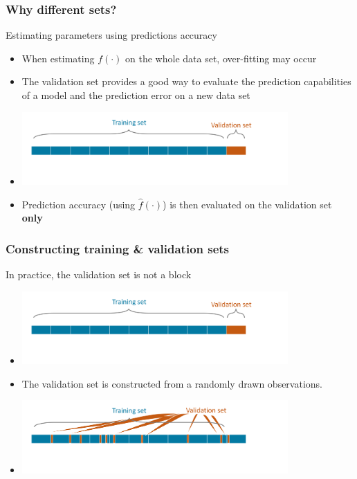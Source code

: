 \documentclass[xcolor=x11names,compress, aspectratio=169]{beamer}
\renewcommand{\(}{\begin{columns}}
\renewcommand{\)}{\end{columns}}
\newcommand{\<}[1]{\begin{column}{#1}}
\renewcommand{\>}{\end{column}}
\begin{document}
\begin{frame}
\frametitle{\textcolor{brique}{Why different sets? }}
Estimating parameters using predictions accuracy
\begin{itemize}[<+->]
\item When estimating $f(\cdot)$ on the whole data set, over-fitting may occur
\item The validation set provides a good way to evaluate the prediction capabilities of a model and the prediction error on a new data set
\item[] \includegraphics[width = 0.8\textwidth]{ML-Sets4.png}
\item Prediction accuracy (using $\widehat f(\cdot)$) is then evaluated on the validation set \textbf{only}
\end{itemize}
\end{frame}


\begin{frame}
\frametitle{\textcolor{brique}{Constructing training \& validation sets}}
In practice, the validation set is not a block
\begin{itemize}[<+->]
\item[] \includegraphics[width = 0.8\textwidth]{ML-Sets4.png}
\item The validation set is constructed from a randomly drawn observations.
\item[] \includegraphics[width = 0.8\textwidth]{ML-Sets5.png}
\end{itemize}
\end{frame}
\end{document}
